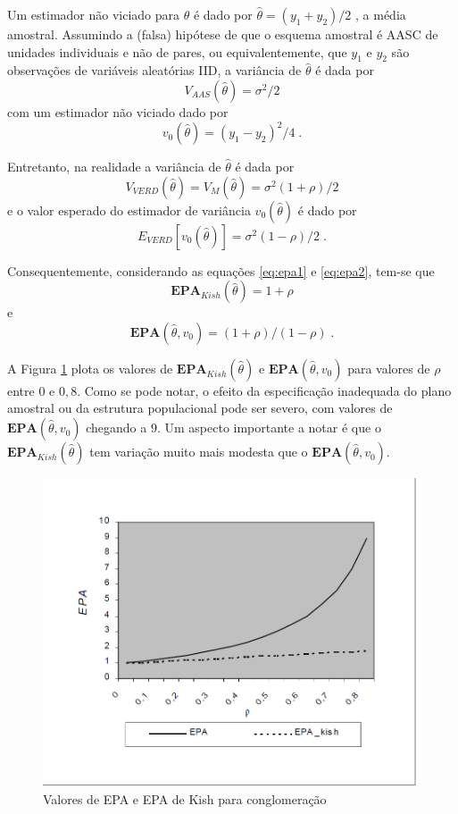 \documentclass[]{book}
\theoremstyle{definition}
\theoremstyle{definition}
\theoremstyle{definition}
\theoremstyle{remark}
\begin{document}
Um estimador não viciado para \(\theta\) é dado por
\(\widehat{\theta }=(y_{1}+y_{2})/2\) , a média amostral. Assumindo a
(falsa) hipótese de que o esquema amostral é AASC de unidades
individuais e não de pares, ou equivalentemente, que \(y_{1}\) e
\(y_{2}\) são observações de variáveis aleatórias IID, a variância de
\(\widehat{\theta }\) é dada por \[
V_{AAS}\left( \widehat{\theta }\right) =\sigma ^{2}/2 
\] com um estimador não viciado dado por \[
v_{0}\left( \widehat{\theta }\right) =(y_{1}-y_{2})^{2}/4\;. 
\]

Entretanto, na realidade a variância de \(\widehat{\theta }\) é dada por
\[
V_{VERD}\left( \widehat{\theta }\right) =V_{M}\left( \widehat{\theta }
\right) =\sigma ^{2}(1+\rho )/2 
\] e o valor esperado do estimador de variância
\(v_{0}\left( \widehat{\theta }\right)\) é dado por \[
E_{VERD}\left[ v_{0}\left( \widehat{\theta }\right) \right] =\sigma
^{2}(1-\rho )/2\;. 
\]

Consequentemente, considerando as equações \eqref{eq:epa1} e
\eqref{eq:epa2}, tem-se que \[
\mathbf{EPA}_{Kish}\left( \hat{\theta}\right) =1+\rho 
\] e \[
\mathbf{EPA}\left( \hat{\theta},v_{0}\right) =(1+\rho )/(1-\rho )\;. 
\]

A Figura \ref{fig:epacong} plota os valores de
\(\mathbf{EPA}_{Kish}\left( \hat{\theta}\right)\) e
\(\mathbf{EPA}\left( \hat{\theta},v_{0}\right)\) para valores de
\(\rho\) entre \(0\) e \(0,8\). Como se pode notar, o efeito da
especificação inadequada do plano amostral ou da estrutura populacional
pode ser severo, com valores de
\(\mathbf{EPA}\left( \hat{\theta},v_{0}\right)\) chegando a \(9\). Um
aspecto importante a notar é que o
\(\mathbf{EPA}_{Kish}\left( \hat{\theta}\right)\) tem variação muito
mais modesta que o \(\mathbf{EPA}\left( \hat{\theta},v_{0}\right)\).

\begin{figure}
\centering
\includegraphics{Figuras/fig41.png}
\caption{\label{fig:epacong}Valores de EPA e EPA de Kish para conglomeração}
\end{figure}
\end{document}
